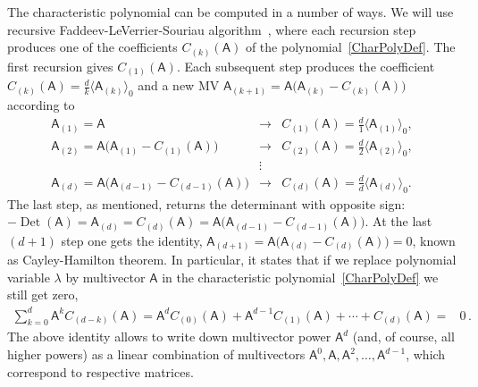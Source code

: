 \documentclass[AMA,STIX1COL]{WileyNJD-v2}
\def\m#1{\mathsf{#1}} %
\DeclareMathOperator{\Det}{Det} %
\def\m#1{\mathsf{#1}}%
\begin{document}
The characteristic polynomial can be computed in a number of ways.
We will use recursive Faddeev-LeVerrier-Souriau algorithm~\cite{Householder1975,Hou1998,Shirokov2021}, where each
recursion step produces one of the coefficients $C_{(k)}(\m{A})$
of the polynomial~\eqref{CharPolyDef}. The first recursion gives
$C_{(1)}(\m{A})$. Each subsequent  step produces the coefficient
$C_{(k)}(\m{A})=\frac{d}{k}\langle \m{A}_{(k)} \rangle_{0}$ and a
new MV $\m{A}_{(k+1)}=\m{A}
\bigl(\m{A}_{(k)}-C_{(k)}(\m{A})\bigr)$ according to
\begin{equation}\label{FLAlg}
  \begin{array}{rcl}
 \m{A}_{(1)}=\m{A}&\rightarrow&C_{(1)}(\m{A})=\frac{d}{1}\langle \m{A}_{(1)}\rangle_0,\\
 \m{A}_{(2)}=\m{A}\bigl(\m{A}_{(1)}-C_{(1)}(\m{A})\bigr)
&\rightarrow&C_{(2)}(\m{A})=\frac{d}{2}\langle \m{A}_{(2)}\rangle_0,\\
    &\vdots&\\
 \m{A}_{(d)}=\m{A}\bigl(\m{A}_{(d-1)}-C_{(d-1)}(\m{A})\bigr)
&\rightarrow&C_{(d)}(\m{A})=\frac{d}{d}\langle
\m{A}_{(d)}\rangle_0.
\end{array}
\end{equation}
The last step, as mentioned, returns the determinant with
opposite sign: $-\Det(\m{A})=\m{A}_{(d)}=C_{(d)}(\m{A})=\m{A}
\bigl(\m{A}_{(d-1)}-C_{(d-1)}(\m{A})\bigr)$. At the last $(d+1)$
step one gets the identity,
$\m{A}_{(d+1)}=\m{A}\bigl(\m{A}_{(d)}-C_{(d)}(\m{A})\bigr)=0$,
known as Cayley-Hamilton theorem. In particular, it states that if we replace
polynomial variable $\lambda$ by multivector $\m{A}$ in the
characteristic polynomial~\eqref{CharPolyDef} we still get
zero,
\begin{align}\label{CayleyHamiltonFormula}
  \sum_{k=0}^{d}  \m{A}^k C_{(d-k)}(\m{A})=\m{A}^{d}C_{(0)}(\m{A})+\m{A}^{d-1}C_{(1)}(\m{A})+\cdots + C_{(d)}(\m{A})= &0\,.
\end{align}
The above identity allows to write down multivector power
$\m{A}^d$ (and, of course, all higher powers) as a linear
combination of multivectors $\m{A}^0,\m{A},\m{A}^2,\ldots,\m{A}^{d-1}$, which correspond to respective matrices.
\end{document}
